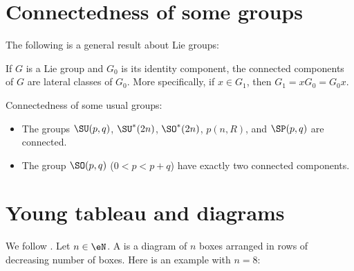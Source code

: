 
\section{Connectedness of some groups}

The following is a general result about Lie groups:
\begin{lemma} \label{LemConnSpecMo}
If $G$ is a Lie group and $G_0$ is its identity component, the connected components of $G$ are lateral classes of $G_0$. More specifically, if $x\in G_1$, then $G_1=xG_0=G_0x$.
\end{lemma}

\begin{lemma}   \label{LemOHjzfsL}
Connectedness of some usual groups:
\begin{itemize}
\item 
    The groups $\SU(p, q)$, $\SU^*(2n)$, $\SO^*(2n)$, $p(n, R)$, and $\SP(p, q)$ are connected.
\item 
    The group $\SO(p, q)$ ($0<p<p+q$) have exactly two connected components.
\end{itemize}
\end{lemma}

					\section{Young tableau and diagrams}

We follow \cite{ModavePoincarre}. Let $n\in \eN$. A  is a diagram of $n$ boxes arranged in rows of decreasing number of boxes. Here is an example with $n=8$:
%	

